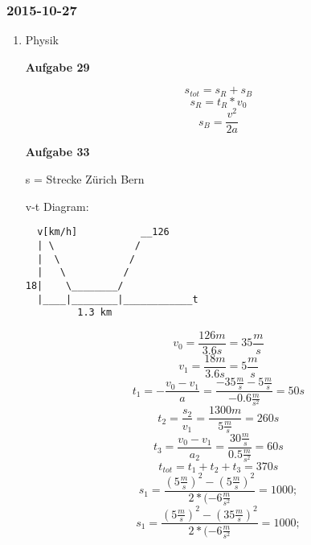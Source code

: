 \documentclass[11pt]{article}
\begin{document}
\subsubsection{2015-10-27}
\label{sec-1-2-9}
\begin{enumerate}
\item Physik
\label{sec-1-2-9-1}

\textbf{Aufgabe 29} 

\begin{equation}
s_{tot} = s_R + s_B
\end{equation}
\begin{equation}
s_R = t_R * v_0
\end{equation}
\begin{equation}
s_B = \frac{v^2}{2a}
\end{equation}


\textbf{Aufgabe 33}

s = Strecke Zürich Bern

v-t Diagram:


\begin{verbatim}
  v[km/h]           __126
  | \              /
  |  \            /
  |   \          /
18|    \________/
  |____|________|____________t 
         1.3 km
\end{verbatim}

\begin{equation}
v_0 = \frac{126m}{3.6s} = 35\frac{m}{s}
\end{equation}
\begin{equation}
v_1 = \frac{18m}{3.6s} = 5\frac{m}{s}
\end{equation}
\begin{equation}
t_1 = -\frac{v_0 - v_1}{a} = \frac{-35\frac{m}{s} - 5\frac{m}{s}}{-0.6\frac{m}{s^2}} = 50s
\end{equation}
\begin{equation}
t_2 = \frac{s_2}{v_1} = \frac{1300m}{5\frac{m}{s}} = 260s
\end{equation}
\begin{equation}
t_3 = \frac{v_0 - v_1}{a_2} = \frac{30\frac{m}{s}}{0.5\frac{m}{s^2}} = 60s
\end{equation}
\begin{equation}
t_{tot} = t_1 + t_2 + t_3 = 370s
\end{equation}
\begin{equation}
s_1 = \frac{(5\frac{m}{s})^2 - (5\frac{m}{s})^2}{2*(-6\frac{m}{s^2}} = 1000;
\end{equation}
\begin{equation}
s_1 = \frac{(5\frac{m}{s})^2 - (35\frac{m}{s})^2}{2*(-6\frac{m}{s^2}} = 1000;
\end{equation}


\end{enumerate}
\end{document}
